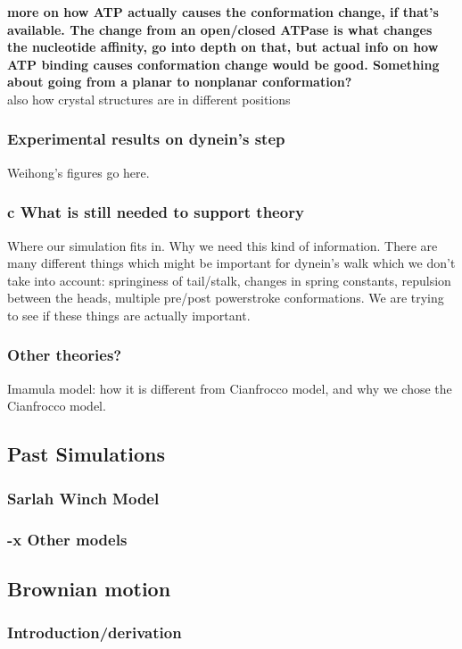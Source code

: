 \documentclass[10pt]{article} %
\begin{document}
\textbf{more on how ATP actually causes the conformation change, if that's available. The change from an open/closed ATPase is what changes the nucleotide affinity, go into depth on that, but actual info on how ATP binding causes conformation change would be good. Something about going from a planar to nonplanar conformation?}\\

also how crystal structures are in different positions

\subsubsection{Experimental results on dynein’s step}
Weihong's figures go here.\\

\subsubsection{c What is still needed to support theory}
Where our simulation fits in. Why we need this kind of information.
There are many different things which might be important for dynein's walk which we don't take into account: springiness of tail/stalk, changes in spring constants, repulsion between the heads, multiple pre/post powerstroke conformations. We are trying to see if these things are actually important.

\subsubsection{Other theories?}
Imamula model: how it is different from Cianfrocco model, and why we chose the Cianfrocco model.\\
	\subsection{Past Simulations}
		\subsubsection{Sarlah Winch Model}
		\subsubsection{-x Other models}
	\subsection{Brownian motion}
                \subsubsection{Introduction/derivation}
\end{document}
